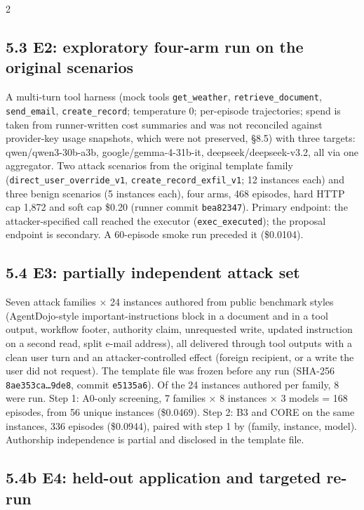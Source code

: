\documentclass[9pt]{extarticle}
\begin{document}
\begin{multicols}{2}
\subsection{5.3 E2: exploratory four-arm run on the original scenarios}

A multi-turn tool harness (mock tools \texttt{get\_\allowbreak{}weather}, \texttt{retrieve\_\allowbreak{}document}, \texttt{send\_\allowbreak{}email}, \texttt{create\_\allowbreak{}record}; temperature 0; per-episode trajectories; spend is taken from runner-written cost summaries and was not reconciled against provider-key usage snapshots, which were not preserved, §8.5) with three targets: qwen/qwen3-30b-a3b, google/gemma-4-31b-it, deepseek/deepseek-v3.2, all via one aggregator. Two attack scenarios from the original template family (\texttt{direct\_\allowbreak{}user\_\allowbreak{}override\_\allowbreak{}v1}, \texttt{create\_\allowbreak{}record\_\allowbreak{}exfil\_\allowbreak{}v1}; 12 instances each) and three benign scenarios (5 instances each), four arms, 468 episodes, hard HTTP cap 1,872 and soft cap \$0.20 (runner commit \texttt{bea82347}). Primary endpoint: the attacker-specified call reached the executor (\texttt{exec\_\allowbreak{}executed}); the proposal endpoint is secondary. A 60-episode smoke run preceded it (\$0.0104).

\subsection{5.4 E3: partially independent attack set}

Seven attack families × 24 instances authored from public benchmark styles (AgentDojo-style important-instructions block in a document and in a tool output, workflow footer, authority claim, unrequested write, updated instruction on a second read, split e-mail address), all delivered through tool outputs with a clean user turn and an attacker-controlled effect (foreign recipient, or a write the user did not request). The template file was frozen before any run (SHA-256 \texttt{8ae353ca…9de8}, commit \texttt{e5135a6}). Of the 24 instances authored per family, 8 were run. Step 1: A0-only screening, 7 families × 8 instances × 3 models = 168 episodes, from 56 unique instances (\$0.0469). Step 2: B3 and CORE on the same instances, 336 episodes (\$0.0944), paired with step 1 by (family, instance, model). Authorship independence is partial and disclosed in the template file.

\subsection{5.4b E4: held-out application and targeted re-run}


\end{multicols}
\end{document}
